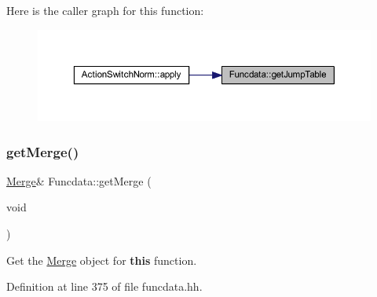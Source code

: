 Here is the caller graph for this function\+:
\nopagebreak
\begin{figure}[H]
\begin{center}
\leavevmode
\includegraphics[width=350pt]{class_funcdata_a475047d15d64d653871facd75f7244ed_icgraph}
\end{center}
\end{figure}
\mbox{\label{class_funcdata_ad7716a2ee4e91b0b91ac0487264673ca}} 
\subsubsection{\texorpdfstring{getMerge()}{getMerge()}}
{\footnotesize\ttfamily \mbox{\hyperlink{class_merge}{Merge}}\& Funcdata\+::get\+Merge (\begin{DoxyParamCaption}\item[{void}]{ }\end{DoxyParamCaption})\hspace{0.3cm}{\ttfamily [inline]}}



Get the \mbox{\hyperlink{class_merge}{Merge}} object for {\bfseries{this}} function. 



Definition at line 375 of file funcdata.\+hh.

